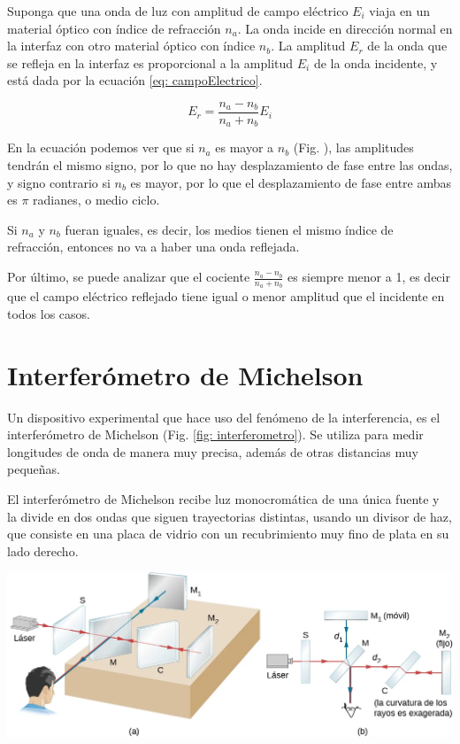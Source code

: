 \documentclass[a4paper,12pt]{article}
\newenvironment{Figure}
  {\par\medskip\noindent\minipage{\linewidth}}
  {\endminipage\par\medskip}
\begin{document}
    Suponga que una onda de luz con amplitud de campo eléctrico $E_i$ viaja en un material óptico con índice de refracción $n_a$. La onda incide en dirección normal en la interfaz con otro material óptico con índice $n_b$. La amplitud $E_r$ de la onda que se refleja en la interfaz es proporcional a la amplitud $E_i$ de la onda incidente, y está dada por la ecuación \ref{eq: campoElectrico}. \cite{Sears}

    \begin{equation}
        E_r = \frac{n_a - n_b}{n_a + n_b} E_i
        \label{eq: campoElectrico}
    \end{equation}

    En la ecuación podemos ver que si $n_a$ es mayor a $n_b$ (Fig. ), las amplitudes tendrán el mismo signo, por lo que no hay desplazamiento de fase entre las ondas, y signo contrario si $n_b$ es mayor, por lo que el desplazamiento de fase entre ambas es $\pi$ radianes, o medio ciclo.

    Si $n_a$ y $n_b$ fueran iguales, es decir, los medios tienen el mismo índice de refracción, entonces no va a haber una onda reflejada.

    Por último, se puede analizar que el cociente $\frac{n_a - n_b}{n_a + n_b}$ es siempre menor a 1, es decir que el campo eléctrico reflejado tiene igual o menor amplitud que el incidente en todos los casos.

\section*{Interferómetro de Michelson}

    Un dispositivo experimental que hace uso del fenómeno de la interferencia, es el interferómetro de Michelson (Fig. \ref{fig: interferometro}). Se utiliza para medir longitudes de onda de manera muy precisa, además de otras distancias muy pequeñas.

    El interferómetro de Michelson recibe luz monocromática de una única fuente y la divide en dos ondas que siguen trayectorias distintas, usando un divisor de haz, que consiste en una placa de vidrio con un recubrimiento muy fino de plata en su lado derecho.

    \begin{Figure}
        \centering
        \includegraphics[width=0.7\linewidth]{interferometroMichelson.jpg}
        \label{fig: interferometro}
    \end{Figure}
\end{document}
